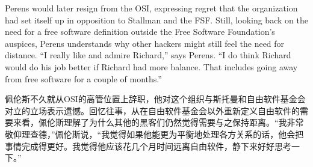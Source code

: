 




\ifdefined\eng
Perens would later resign from the OSI, expressing regret that the organization had set itself up in opposition to Stallman and the FSF. Still, looking back on the need for a free software definition outside the Free Software Foundation's auspices, Perens understands why other hackers might still feel the need for distance. ``I really like and admire Richard,'' says Perens. ``I do think Richard would do his job better if Richard had more balance. That includes going away from free software for a couple of months.''
\fi

\ifdefined\chs
佩伦斯不久就从OSI的高管位置上辞职，他对这个组织与斯托曼和自由软件基金会对立的立场表示遗憾。回忆往事，从在自由软件基金会以外重新定义自由软件的需要来看，佩伦斯理解了为什么其他的黑客们仍然觉得需要与之保持距离。``我非常敬仰理查德，''佩伦斯说，``我觉得如果他能更为平衡地处理各方关系的话，他会把事情完成得更好。我觉得他应该花几个月时间远离自由软件，静下来好好思考一下。''
\fi

